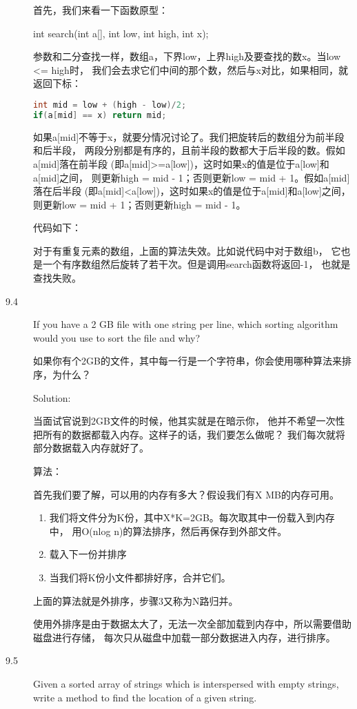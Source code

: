 \begin{description}
首先，我们来看一下函数原型：

int search(int a[], int low, int high, int x);

参数和二分查找一样，数组a，下界low，上界high及要查找的数x。当low <= high时， 我们会去求它们中间的那个数，然后与x对比，如果相同，就返回下标：
\begin{lstlisting}[language=C++]
int mid = low + (high - low)/2;
if(a[mid] == x) return mid;
\end{lstlisting}
如果a[mid]不等于x，就要分情况讨论了。我们把旋转后的数组分为前半段和后半段， 两段分别都是有序的，且前半段的数都大于后半段的数。假如a[mid]落在前半段 (即a[mid]>=a[low])，这时如果x的值是位于a[low]和a[mid]之间， 则更新high = mid - 1；否则更新low = mid + 1。假如a[mid]落在后半段 (即a[mid]<a[low])，这时如果x的值是位于a[mid]和a[low]之间， 则更新low = mid + 1；否则更新high = mid - 1。

代码如下：

对于有重复元素的数组，上面的算法失效。比如说代码中对于数组b， 它也是一个有序数组然后旋转了若干次。但是调用search函数将返回-1， 也就是查找失败。


\item[9.4] If you have a 2 GB file with one string per line, which sorting algorithm would you use to sort the file and why?

如果你有个2GB的文件，其中每一行是一个字符串，你会使用哪种算法来排序，为什么？

Solution: 

当面试官说到2GB文件的时候，他其实就是在暗示你， 他并不希望一次性把所有的数据都载入内存。这样子的话，我们要怎么做呢？ 我们每次就将部分数据载入内存就好了。

算法：

首先我们要了解，可以用的内存有多大？假设我们有X MB的内存可用。
\begin{enumerate}
\item 我们将文件分为K份，其中X*K=2GB。每次取其中一份载入到内存中， 用O(nlog n)的算法排序，然后再保存到外部文件。
\item 载入下一份并排序
\item 当我们将K份小文件都排好序，合并它们。
\end{enumerate}
上面的算法就是外排序，步骤3又称为N路归并。

使用外排序是由于数据太大了，无法一次全部加载到内存中，所以需要借助磁盘进行存储， 每次只从磁盘中加载一部分数据进入内存，进行排序。


\item[9.5] Given a sorted array of strings which is interspersed with empty strings, write a method to find the location of a given string.


\end{description}
